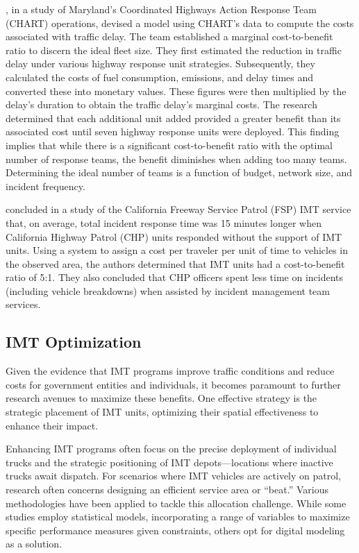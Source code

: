 \documentclass[
  letterpaper,
  authoryear]{elsarticle}
\begin{document}
\citet{kim2012}, in a study of Maryland's Coordinated Highways Action
Response Team (CHART) operations, devised a model using CHART's data to
compute the costs associated with traffic delay. The team established a
marginal cost-to-benefit ratio to discern the ideal fleet size. They
first estimated the reduction in traffic delay under various highway
response unit strategies. Subsequently, they calculated the costs of
fuel consumption, emissions, and delay times and converted these into
monetary values. These figures were then multiplied by the delay's
duration to obtain the traffic delay's marginal costs. The research
determined that each additional unit added provided a greater benefit
than its associated cost until seven highway response units were
deployed. This finding implies that while there is a significant
cost-to-benefit ratio with the optimal number of response teams, the
benefit diminishes when adding too many teams. Determining the ideal
number of teams is a function of budget, network size, and incident
frequency.

\citet{skabardonis1998} concluded in a study of the California Freeway
Service Patrol (FSP) IMT service that, on average, total incident
response time was 15 minutes longer when California Highway Patrol (CHP)
units responded without the support of IMT units. Using a system to
assign a cost per traveler per unit of time to vehicles in the observed
area, the authors determined that IMT units had a cost-to-benefit ratio
of 5:1. They also concluded that CHP officers spent less time on
incidents (including vehicle breakdowns) when assisted by incident
management team services.~

\hypertarget{imt-optimization}{%
\subsection{IMT Optimization}\label{imt-optimization}}

Given the evidence that IMT programs improve traffic conditions and
reduce costs for government entities and individuals, it becomes
paramount to further research avenues to maximize these benefits. One
effective strategy is the strategic placement of IMT units, optimizing
their spatial effectiveness to enhance their impact.

Enhancing IMT programs often focus on the precise deployment of
individual trucks and the strategic positioning of IMT
depots---locations where inactive trucks await dispatch. For scenarios
where IMT vehicles are actively on patrol, research often concerns
designing an efficient service area or ``beat.'' Various methodologies
have been applied to tackle this allocation challenge. While some
studies employ statistical models, incorporating a range of variables to
maximize specific performance measures given constraints, others opt for
digital modeling as a solution.
\end{document}

